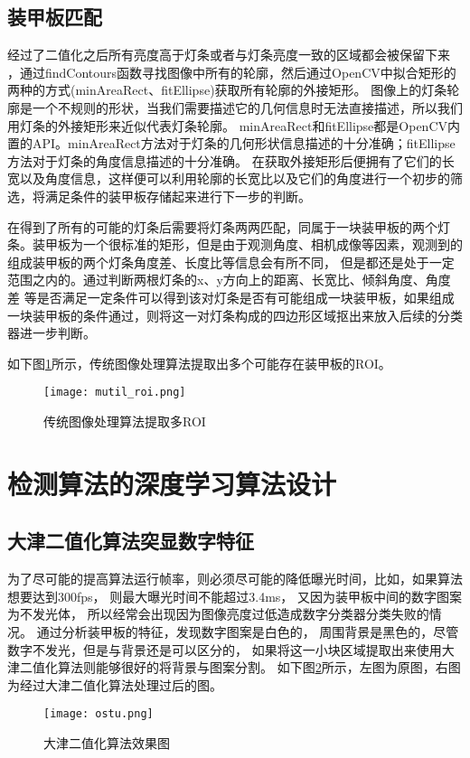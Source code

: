 \subsection{装甲板匹配}

经过了二值化之后所有亮度高于灯条或者与灯条亮度一致的区域都会被保留下来
，通过findContours函数寻找图像中所有的轮廓，然后通过OpenCV中拟合矩形的两种的方式(minAreaRect、fitEllipse)获取所有轮廓的外接矩形。
图像上的灯条轮廓是一个不规则的形状，当我们需要描述它的几何信息时无法直接描述，所以我们用灯条的外接矩形来近似代表灯条轮廓。
minAreaRect和fitEllipse都是OpenCV内置的API。minAreaRect方法对于灯条的几何形状信息描述的十分准确；fitEllipse方法对于灯条的角度信息描述的十分准确。
在获取外接矩形后便拥有了它们的长宽以及角度信息，这样便可以利用轮廓的长宽比以及它们的角度进行一个初步的筛选，将满足条件的装甲板存储起来进行下一步的判断。\par


在得到了所有的可能的灯条后需要将灯条两两匹配，同属于一块装甲板的两个灯条。装甲板为一个很标准的矩形，但是由于观测角度、相机成像等因素，观测到的组成装甲板的两个灯条角度差、长度比等信息会有所不同，
但是都还是处于一定范围之内的。通过判断两根灯条的x、y方向上的距离、长宽比、倾斜角度、角度差
等是否满足一定条件可以得到该对灯条是否有可能组成一块装甲板，如果组成一块装甲板的条件通过，则将这一对灯条构成的四边形区域抠出来放入后续的分类器进一步判断。\par
如下图\ref{传统图像处理算法提取多ROI}所示，传统图像处理算法提取出多个可能存在装甲板的ROI。

\begin{figure}[H]
    \centering
    \texttt{[image: mutil\_roi.png]} 
    \caption{传统图像处理算法提取多ROI} 
    \label{传统图像处理算法提取多ROI}
\end{figure}





\section{检测算法的深度学习算法设计}
\subsection{大津二值化算法突显数字特征}
为了尽可能的提高算法运行帧率，则必须尽可能的降低曝光时间，比如，如果算法想要达到300fps，
则最大曝光时间不能超过3.4ms，
又因为装甲板中间的数字图案为不发光体，
所以经常会出现因为图像亮度过低造成数字分类器分类失败的情况。
通过分析装甲板的特征，发现数字图案是白色的，
周围背景是黑色的，尽管数字不发光，但是与背景还是可以区分的，
如果将这一小块区域提取出来使用大津二值化算法则能够很好的将背景与图案分割。
如下图\ref{ostu}所示，左图为原图，右图为经过大津二值化算法处理过后的图。
\begin{figure}[H]
    \centering
    \texttt{[image: ostu.png]} 
    \caption{大津二值化算法效果图} 
    \label{ostu}
\end{figure}




